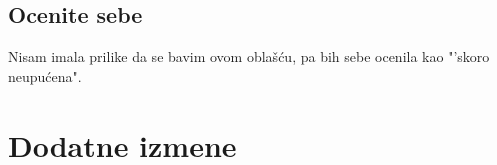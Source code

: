 \documentclass[a4paper]{report}
\begin{document}
\section{Ocenite sebe}


Nisam imala prilike da se bavim ovom oblašću, pa bih sebe ocenila kao "'skoro neupućena".


\chapter{Dodatne izmene}
\end{document}
